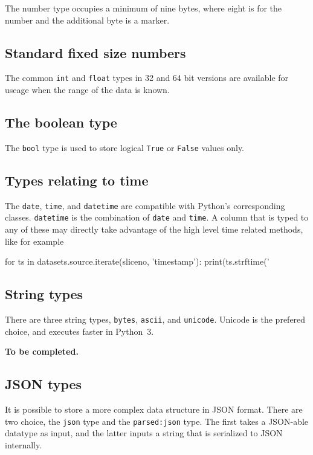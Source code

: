 The number type occupies a minimum of nine bytes, where eight is for
the number and the additional byte is a marker.


\subsection{Standard fixed size numbers}
The common \texttt{int} and \texttt{float} types in 32 and 64 bit
versions are available for useage when the range of the data is known.


\subsection{The boolean type}
The \texttt{bool} type is used to store logical \texttt{True} or
\texttt{False} values only.


\subsection{Types relating to time}
The \texttt{date}, \texttt{time}, and \texttt{datetime} are compatible
with Python's corresponding classes.  \texttt{datetime} is the
combination of \texttt{date} and \texttt{time}.  A column that is
typed to any of these may directly take advantage of the high level
time related methods, like for example

\begin{python}
  for ts in datasets.source.iterate(sliceno, 'timestamp'):
    print(ts.strftime('%
\end{python}


\subsection{String types}
There are three string types, \texttt{bytes}, \texttt{ascii}, and
\texttt{unicode}.  Unicode is the prefered choice, and executes faster
in Python~3.

\textbf{To be completed.}

\subsection{JSON types}
It is possible to store a more complex data structure in JSON format.
There are two choice, the \texttt{json} type and the
\texttt{parsed:json} type.  The first takes a JSON-able datatype as
input, and the latter inputs a string that is serialized to JSON
internally.



